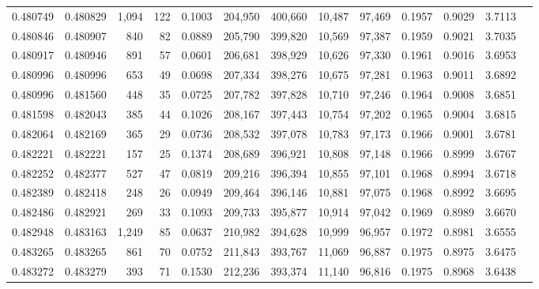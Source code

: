 \begin{tabular}{rrrrrrrrrrrrr}
0.480749 & 0.480829 & 1,094 &   122 &                                     0.1003 & 204,950 & 400,660 &  10,487 &  97,469 & 0.1957 & 0.9029 & 3.7113 \\
0.480846 & 0.480907 &   840 &    82 &                                     0.0889 & 205,790 & 399,820 &  10,569 &  97,387 & 0.1959 & 0.9021 & 3.7035 \\
0.480917 & 0.480946 &   891 &    57 &                                     0.0601 & 206,681 & 398,929 &  10,626 &  97,330 & 0.1961 & 0.9016 & 3.6953 \\
0.480996 & 0.480996 &   653 &    49 &                                     0.0698 & 207,334 & 398,276 &  10,675 &  97,281 & 0.1963 & 0.9011 & 3.6892 \\
0.480996 & 0.481560 &   448 &    35 &                                     0.0725 & 207,782 & 397,828 &  10,710 &  97,246 & 0.1964 & 0.9008 & 3.6851 \\
0.481598 & 0.482043 &   385 &    44 &                                     0.1026 & 208,167 & 397,443 &  10,754 &  97,202 & 0.1965 & 0.9004 & 3.6815 \\
0.482064 & 0.482169 &   365 &    29 &                                     0.0736 & 208,532 & 397,078 &  10,783 &  97,173 & 0.1966 & 0.9001 & 3.6781 \\
0.482221 & 0.482221 &   157 &    25 &                                     0.1374 & 208,689 & 396,921 &  10,808 &  97,148 & 0.1966 & 0.8999 & 3.6767 \\
0.482252 & 0.482377 &   527 &    47 &                                     0.0819 & 209,216 & 396,394 &  10,855 &  97,101 & 0.1968 & 0.8994 & 3.6718 \\
0.482389 & 0.482418 &   248 &    26 &                                     0.0949 & 209,464 & 396,146 &  10,881 &  97,075 & 0.1968 & 0.8992 & 3.6695 \\
0.482486 & 0.482921 &   269 &    33 &                                     0.1093 & 209,733 & 395,877 &  10,914 &  97,042 & 0.1969 & 0.8989 & 3.6670 \\
0.482948 & 0.483163 & 1,249 &    85 &                                     0.0637 & 210,982 & 394,628 &  10,999 &  96,957 & 0.1972 & 0.8981 & 3.6555 \\
0.483265 & 0.483265 &   861 &    70 &                                     0.0752 & 211,843 & 393,767 &  11,069 &  96,887 & 0.1975 & 0.8975 & 3.6475 \\
0.483272 & 0.483279 &   393 &    71 &                                     0.1530 & 212,236 & 393,374 &  11,140 &  96,816 & 0.1975 & 0.8968 & 3.6438 \\

\end{tabular}
